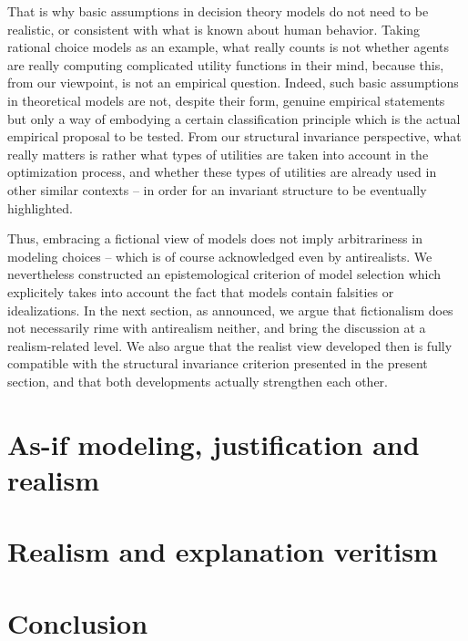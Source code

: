 \documentclass[a4paper,11pt]{article}
\theoremstyle{definition}
\begin{document}
That is why basic assumptions in decision theory models do not need to be realistic, or consistent with what is known about human behavior. Taking rational choice models as an example, what really counts is not whether agents are really computing complicated utility functions in their mind, because this, from our viewpoint, is not an empirical question. Indeed, such basic assumptions in theoretical models are not, despite their form, genuine empirical statements but only a way of embodying a certain classification principle which is the actual empirical proposal to be tested. From our structural invariance perspective, what really matters is rather what types of utilities are taken into account in the optimization process, and whether these types of utilities are already used in other similar contexts -- in order for an invariant structure to be eventually highlighted. 

Thus, embracing a fictional view of models does not imply arbitrariness in modeling choices -- which is of course acknowledged even by antirealists. We nevertheless constructed an epistemological criterion of model selection which explicitely takes into account the fact that models contain falsities or idealizations. In the next section, as announced, we argue that fictionalism does not necessarily rime with antirealism neither, and bring the discussion at a realism-related level. We also argue that the realist view developed then is fully compatible with the structural invariance criterion presented in the present section, and that both developments actually strengthen each other.

\section{As-if modeling, justification and realism}
\label{sec:asif_realism}
\section{Realism and explanation veritism}

\section{Conclusion}

 

\end{document}
